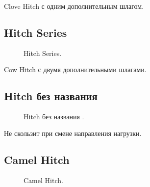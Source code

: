 Clove Hitch с одним дополнительным шлагом.

\subsection{Hitch Series}

\begin{figure}[H]\centering
	\begin{minipage}{1\linewidth}
		\begin{center}
			\tcbox[enhanced jigsaw,colframe=black,opacityframe=0.5,opacityback=0.5]
			{\centering{}}
		\end{center}
	\end{minipage}
\caption{Hitch Series.}
\label{ris:Hitch_Series}
\end{figure}

Cow Hitch с двумя дополнительными шлагами.

\addtocounter{HitchNoName}{1}

\subsection{Hitch без названия }

\begin{figure}[H]\centering
	\begin{minipage}{1\linewidth}
		\begin{center}
			\tcbox[enhanced jigsaw,colframe=black,opacityframe=0.5,opacityback=0.5]
			{\centering{}}
		\end{center}
	\end{minipage}
\caption{Hitch без названия .}
\label{ris:Hitch_noname_13}
\end{figure}

Не скользит при смене направления нагрузки.

\subsection{Camel Hitch}

\begin{figure}[H]\centering
	\begin{minipage}{1\linewidth}
		\begin{center}
			\tcbox[enhanced jigsaw,colframe=black,opacityframe=0.5,opacityback=0.5]
			{\centering{}}
		\end{center}
	\end{minipage}
\caption{Camel Hitch.}
\label{ris:Camel_Hitch}
\end{figure}


